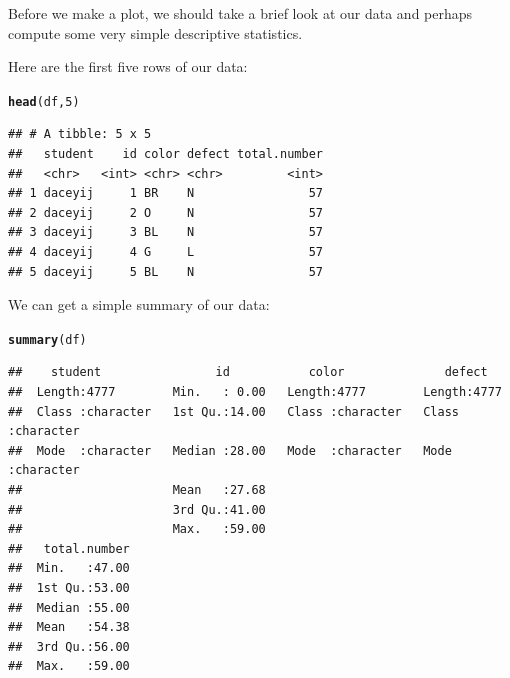 \documentclass{article}\usepackage[]{graphicx}\usepackage[]{color}
\makeatletter
\newcommand{\hlnum}[1]{\textcolor[rgb]{0.686,0.059,0.569}{#1}}%
\newcommand{\hlstd}[1]{\textcolor[rgb]{0.345,0.345,0.345}{#1}}%
\newcommand{\hlkwd}[1]{\textcolor[rgb]{0.737,0.353,0.396}{\textbf{#1}}}%
\newenvironment{kframe}{%
 \def\at@end@of@kframe{}%
 \ifinner\ifhmode%
  \def\at@end@of@kframe{\end{minipage}}%
  \begin{minipage}{\columnwidth}%
 \fi\fi%
 \def\FrameCommand##1{\hskip\@totalleftmargin \hskip-\fboxsep
 \colorbox{shadecolor}{##1}\hskip-\fboxsep
     \hskip-\linewidth \hskip-\@totalleftmargin \hskip\columnwidth}%
 \MakeFramed {\advance\hsize-\width
   \@totalleftmargin\z@ \linewidth\hsize
   \@setminipage}}%
 {\par\unskip\endMakeFramed%
 \at@end@of@kframe}
\newenvironment{knitrout}{}{} %
\makeatother
\begin{document}
Before we make a plot, we should take a brief look at our data and perhaps compute some very simple descriptive statistics. 

Here are the first five rows of our data:
\begin{knitrout}
\color{fgcolor}\begin{kframe}
\begin{alltt}
\hlkwd{head}\hlstd{(df,}\hlnum{5}\hlstd{)}
\end{alltt}
\begin{verbatim}
## # A tibble: 5 x 5
##   student    id color defect total.number
##   <chr>   <int> <chr> <chr>         <int>
## 1 daceyij     1 BR    N                57
## 2 daceyij     2 O     N                57
## 3 daceyij     3 BL    N                57
## 4 daceyij     4 G     L                57
## 5 daceyij     5 BL    N                57
\end{verbatim}
\end{kframe}
\end{knitrout}

We can get a simple summary of our data:
\begin{knitrout}
\color{fgcolor}\begin{kframe}
\begin{alltt}
\hlkwd{summary}\hlstd{(df)}
\end{alltt}
\begin{verbatim}
##    student                id           color              defect         
##  Length:4777        Min.   : 0.00   Length:4777        Length:4777       
##  Class :character   1st Qu.:14.00   Class :character   Class :character  
##  Mode  :character   Median :28.00   Mode  :character   Mode  :character  
##                     Mean   :27.68                                        
##                     3rd Qu.:41.00                                        
##                     Max.   :59.00                                        
##   total.number  
##  Min.   :47.00  
##  1st Qu.:53.00  
##  Median :55.00  
##  Mean   :54.38  
##  3rd Qu.:56.00  
##  Max.   :59.00
\end{verbatim}
\end{kframe}
\end{knitrout}
\end{document}
